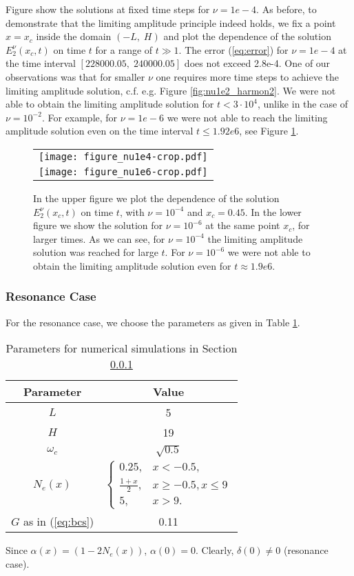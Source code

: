 Figure show the solutions at fixed time steps for $\nu=1e-4$. As before, 
to demonstrate that the limiting amplitude principle indeed holds, we fix a point $x=x_c$ 
inside the domain $(-L,\; H)$ and plot 
the dependence of the solution $E_{2}^{\nu}(x_c,t)$ on time $t$ for a range of $t\gg 1$. 
The error (\ref{eq:error}) for $\nu=1e-4$ at the time interval $[228000.05,\; 240000.05]$ does not exceed 2.8e-4. 
One of our observations was that for smaller $\nu$ one requires more time steps to achieve the limiting amplitude solution, 
c.f. e.g. Figure \ref{fig:nu1e2_harmon2}. 
We were not able to obtain the limiting amplitude solution for $t<3\cdot 10^{4}$, unlike in the case of $\nu=10^{-2}$. 
For example, for $\nu=1e-6$ we were not able to reach the limiting amplitude solution even on the time interval $t\leq 1.92e6$, 
see Figure \ref{fig:nu1e4_harmon}. 
\begin{figure}
\begin{tabular}{c}
 \texttt{[image: figure\_nu1e4-crop.pdf]}\\
 \texttt{[image: figure\_nu1e6-crop.pdf]}\\
\end{tabular}
\caption{In the upper figure we plot the dependence of the solution $E_{2}^{\nu}(x_c,t)$ on time $t$, with $\nu=10^{-4}$ and $x_c=0.45$. 
In the lower figure we show the solution for $\nu=10^{-6}$ at the same point $x_c$, for larger times. As we can see, for 
$\nu=10^{-4}$ the limiting amplitude solution was reached for large $t$. For $\nu=10^{-6}$ we were not able 
to obtain the limiting amplitude solution even for $t\approx 1.9e6$. }
  \label{fig:nu1e4_harmon}
\end{figure}

\subsubsection{Resonance Case}
\label{sec:resn}
For the resonance case, we choose the parameters as given in Table \ref{tab:parameters_resonance}.
\begin{table}[htb!]
\begin{tabular}{c|c}
Parameter & Value \\
\hline
$L$ & 5\\
$H$ & 19\\
$\omega_c$ &  $\sqrt{0.5}$\\
$N_e(x)$ &  $\left\{
 \begin{array}{cc}
  0.25, & x<-0.5,\\
  \frac{1+x}{2}, & x\geq -0.5, x\leq 9\\
  5, & x>9.
 \end{array}\right.$\\
 $G$ as in (\ref{eq:bcs}) & 0.11 \\
\end{tabular}
\label{tab:parameters_resonance}
\caption{Parameters for numerical simulations in Section \ref{sec:resn}}
\end{table}
Since $\alpha(x)=(1-2N_e(x))$, $\alpha(0)=0$. Clearly, $\delta(0)\neq 0$ (resonance case).

